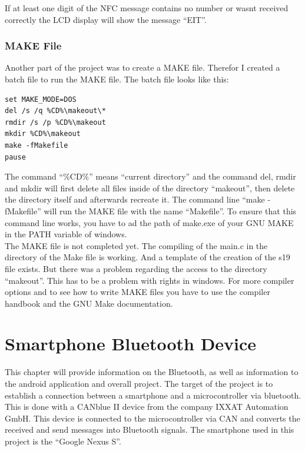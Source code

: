 \documentclass[11pt]{article}
\begin{document}
If at least one digit of the NFC message contains no number or wasnt received correctly the LCD display will show the message "`EIT"'.


\subsubsection{MAKE File}
Another part of the project was to create a MAKE file. Therefor I created a batch file to run the MAKE file. The batch file looks like this:

\begin{lstlisting}
set MAKE_MODE=DOS
del /s /q %CD%\makeout\*
rmdir /s /p %CD%\makeout
mkdir %CD%\makeout
make -fMakefile
pause
\end{lstlisting}

The command "`\%CD\%"' means "`current directory"' and the command del, rmdir and mkdir will first delete all files inside of the directory "`makeout"', then delete the directory itself and afterwards recreate it. The command line "`make -fMakefile"' will run the MAKE file with the name "`Makefile"'. To ensure that this command line works, you have to ad the path of make.exe of your GNU MAKE in the PATH variable of windows.\\

The MAKE file is not completed yet. The compiling of the main.c in the directory of the Make file is working. And a template of the creation of the s19 file exists. But there was a problem regarding the access to the directory "`makeout"'. This has to be a problem with rights in windows. For more compiler options and to see how to write MAKE files you have to use the compiler handbook and the GNU Make documentation.

\newpage
\section{Smartphone Bluetooth Device}

This chapter will provide information on the Bluetooth, as well as information to the android application and overall project. The target of the project is to establish a connection between a smartphone and a microcontroller via bluetooth. This is done with a CANblue II device from the company IXXAT Automation GmbH. This device is connected to the microcontroller via CAN and converts the received and send messages into Bluetooth signals. The smartphone used in this project is the "`Google Nexus S"'.
\end{document}
